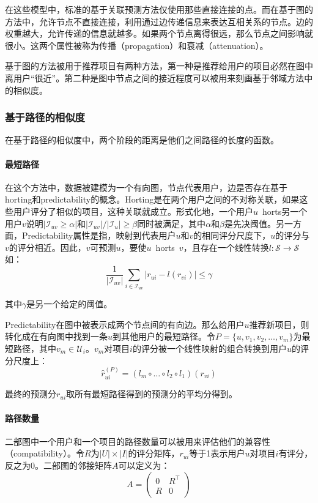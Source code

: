 \documentclass{article}
\begin{document}
 在这些模型中，标准的基于关联预测方法仅使用那些直接连接的点。而在基于图的方法中，允许节点不直接连接，利用通过边传递信息来表达互相关系的节点。边的权重越大，允许传递的信息就越多。如果两个节点离得很远，那么节点之间影响就很小。这两个属性被称为传播（propagation）和衰减（attenuation）。

 基于图的方法被用于推荐项目有两种方法，第一种是推荐给用户的项目必然在图中离用户“很近”。第二种是图中节点之间的接近程度可以被用来刻画基于邻域方法中的相似度。

 \subsubsection{基于路径的相似度}
 在基于路径的相似度中，两个阶段的距离是他们之间路径的长度的函数。
 \paragraph{最短路径}

 在这个方法中，数据被建模为一个有向图，节点代表用户，边是否存在基于horting和predictability的概念。Horting是在两个用户之间的不对称关联，如果这些用户评分了相似的项目，这种关联就成立。形式化地，一个用户$u$\ horts另一个用户$v$说明$|\mathcal{I}_{uv}\geq\alpha|$和$|\mathcal{I}_{uv}|/|\mathcal{I}_{u}|\geq\beta$同时被满足，其中$\alpha$和$\beta$是先决阈值。另一方面，Predictability属性是指，映射到代表用户$u$和$v$的相同评分尺度下，$u$的评分与$v$的评分相近。因此，$v$可预测$u$，要使$u$\ horts\ $v$，且存在一个线性转换$l:\mathcal{S}\rightarrow\mathcal{S}$如：
 $$ \frac{1}{|\mathcal{I}_{uv}|}\mathop{\sum}\limits_{i\in\mathcal{I}_{uv}}|r_{ui}-l(r_{vi})|\leq\gamma $$

 其中$\gamma$是另一个给定的阈值。

 Predictability在图中被表示成两个节点间的有向边。那么给用户$u$推荐新项目，则转化成在有向图中找到一条$u$到其他用户的最短路径。令$P=\{u,v_1,v_2,\dots,v_m\}$为最短路径，其中$v_m\in\mathcal{U}_i$。$v_m$对项目$i$的评分被一个线性映射的组合转换到用户$u$的评分尺度上：
 $$ \hat{r}_{ui}^{(P)}=(l_m\circ\dots\circ l_2\circ l_1)(r_{vi}) $$

 最终的预测分$r_{ui}$取所有最短路径得到的预测分的平均分得到。

 \paragraph{路径数量}

 二部图中一个用户和一个项目的路径数量可以被用来评估他们的兼容性（compatibility）。令$R$为$|U|\times|I|$的评分矩阵，$r_{ui}$等于1表示用户$u$对项目$i$有评分，反之为0。二部图的邻接矩阵$A$可以定义为：
 \[ 
 A=\left(
 \begin{array}{cc}
 0 & R^{\top}\\
 R & 0
 \end{array}
 \right) 
 \]
\end{document}

